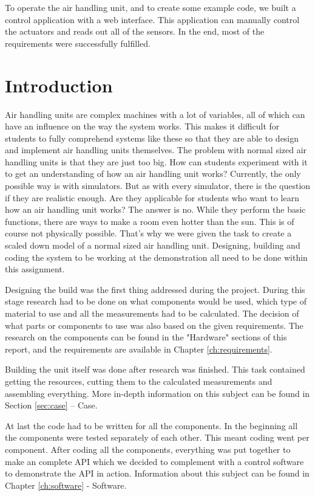 \documentclass[a4paper,oneside]{book}
\begin{document}
To operate the air handling unit, and to create some example code, we built a
control application with a web interface. This application can manually control
the actuators and reads out all of the sensors. In the end, most of the
requirements were successfully fulfilled.


\chapter*{Introduction}
Air handling units are complex machines with a lot of variables, all of which
can have an influence on the way the system works. This makes it difficult for
students to fully comprehend systems like these so that they are able to design
and implement air handling units themselves. The problem with normal sized air
handling units is that they are just too big. How can students experiment with
it to get an understanding of how an air handling unit works? Currently, the
only possible way is with simulators. But as with every simulator, there is the
question if they are realistic enough. Are they applicable for students who
want to learn how an air handling unit works? The answer is no. While they
perform the basic functions, there are ways to make a room even hotter than the
sun. This is of course not physically possible. That's why we were given the
task to create a scaled down model of a normal sized air handling unit.
Designing, building and coding the system to be working at the demonstration
all need to be done within this assignment. 

Designing the build was the first thing addressed during the project. During
this stage research had to be done on what components would be used, which type
of material to use and all the measurements had to be calculated. The decision
of what parts or components to use was also based on the given requirements.
The research on the components can be found in the "Hardware" sections of this
report, and the requirements are available in Chapter \ref{ch:requirements}.

Building the unit itself was done after research was finished. This task
contained getting the resources, cutting them to the calculated measurements
and assembling everything. More in-depth information on this subject can be
found in Section \ref{sec:case} -- Case.

At last the code had to be written for all the components. In the beginning all
the components were tested separately of each other. This meant coding went per
component. After coding all the components, everything was put together to make
an complete API which we decided to complement with a control software to
demonstrate the API in action. Information about this subject can be found in
Chapter \ref{ch:software} - Software.
\end{document}
